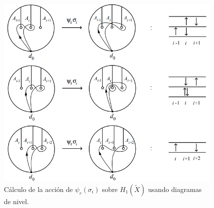\documentclass[TFG.tex]{subfiles}
\begin{document}




\begin{figure}[h!]
\includegraphics[scale=0.7]{Imagenes/Burau}
\caption{Cálculo de la acción de $\psi_r(\sigma_i)$ sobre $H_1(\widetilde{X})$ usando diagramas de nivel.}\label{representacion}
\end{figure}
\end{document}
